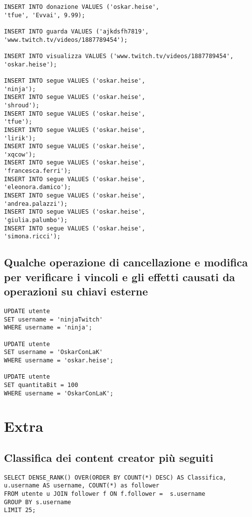 \begin{lstlisting}
INSERT INTO donazione VALUES ('oskar.heise', 
'tfue', 'Evvai', 9.99);

INSERT INTO guarda VALUES ('ajkdsfh7819',
'www.twitch.tv/videos/1887789454');

INSERT INTO visualizza VALUES ('www.twitch.tv/videos/1887789454',
'oskar.heise');

INSERT INTO segue VALUES ('oskar.heise',
'ninja');
INSERT INTO segue VALUES ('oskar.heise',
'shroud');
INSERT INTO segue VALUES ('oskar.heise',
'tfue');
INSERT INTO segue VALUES ('oskar.heise',
'lirik');
INSERT INTO segue VALUES ('oskar.heise',
'xqcow');
INSERT INTO segue VALUES ('oskar.heise',
'francesca.ferri');
INSERT INTO segue VALUES ('oskar.heise',
'eleonora.damico');
INSERT INTO segue VALUES ('oskar.heise',
'andrea.palazzi');
INSERT INTO segue VALUES ('oskar.heise',
'giulia.palumbo');
INSERT INTO segue VALUES ('oskar.heise',
'simona.ricci');
\end{lstlisting}
















\subsection{Qualche operazione di cancellazione e modifica per verificare i vincoli e gli effetti causati da operazioni su chiavi esterne}

\begin{lstlisting}
UPDATE utente
SET username = 'ninjaTwitch'
WHERE username = 'ninja';

UPDATE utente
SET username = 'OskarConLaK'
WHERE username = 'oskar.heise';

UPDATE utente
SET quantitaBit = 100
WHERE username = 'OskarConLaK';
\end{lstlisting}




\section{Extra}
\subsection*{Classifica dei content creator più seguiti}
\begin{lstlisting}
SELECT DENSE_RANK() OVER(ORDER BY COUNT(*) DESC) AS Classifica, 
u.username AS username, COUNT(*) as follower
FROM utente u JOIN follower f ON f.follower =  s.username
GROUP BY s.username
LIMIT 25;
\end{lstlisting}
